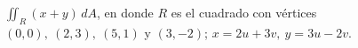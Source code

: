 \item $\iint_R (x + y) \, dA$, en donde $R$ es el cuadrado con vértices $(0, 0), \ (2, 3), \ (5, 1)$ y $(3, -2)$; $x = 2u + 3v, \ y = 3u - 2v$.
